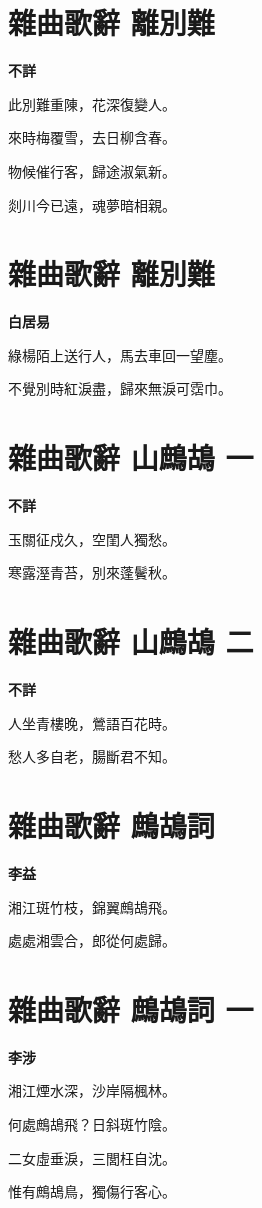 \documentclass[12pt,a4paper]{ctexbook}
\begin{document}
\section{雜曲歌辭 離別難}
\textbf{不詳}\par\vspace{0.5em}
此別難重陳，花深復變人。\par
來時梅覆雪，去日柳含春。\par
物候催行客，歸途淑氣新。\par
剡川今已遠，魂夢暗相親。\par

\section{雜曲歌辭 離別難}
\textbf{白居易}\par\vspace{0.5em}
綠楊陌上送行人，馬去車回一望塵。\par
不覺別時紅淚盡，歸來無淚可霑巾。\par

\section{雜曲歌辭 山鷓鴣 一}
\textbf{不詳}\par\vspace{0.5em}
玉關征戍久，空閨人獨愁。\par
寒露溼青苔，別來蓬鬢秋。\par

\section{雜曲歌辭 山鷓鴣 二}
\textbf{不詳}\par\vspace{0.5em}
人坐青樓晚，鶯語百花時。\par
愁人多自老，腸斷君不知。\par

\section{雜曲歌辭 鷓鴣詞}
\textbf{李益}\par\vspace{0.5em}
湘江斑竹枝，錦翼鷓鴣飛。\par
處處湘雲合，郎從何處歸。\par

\section{雜曲歌辭 鷓鴣詞 一}
\textbf{李涉}\par\vspace{0.5em}
湘江煙水深，沙岸隔楓林。\par
何處鷓鴣飛？日斜斑竹陰。\par
二女虛垂淚，三閭枉自沈。\par
惟有鷓鴣鳥，獨傷行客心。\par
\end{document}
